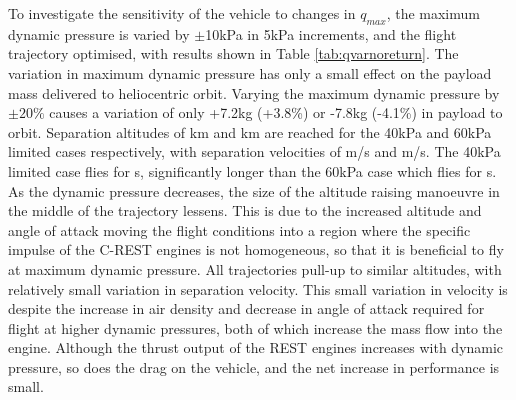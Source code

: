 To investigate the sensitivity of the vehicle to changes in $q_{max}$, the maximum dynamic pressure is varied by $\pm$10kPa in 5kPa increments, and the flight trajectory optimised, with results shown in Table \ref{tab:qvarnoreturn}.
The variation in maximum dynamic pressure has only a small effect on the payload mass delivered to heliocentric orbit.  Varying the maximum dynamic pressure by $\pm20\%$ causes a variation of only  +7.2kg (+3.8\%) or -7.8kg (-4.1\%) in payload to orbit.  
Separation altitudes of \secondthirdSeparationAltqFortyNoReturn km and \secondthirdSeparationAltqSixtyNoReturn km are reached for the 40kPa and 60kPa limited cases respectively, with separation velocities of \secondthirdSeparationvqFortyNoReturn m/s and \secondthirdSeparationvqSixtyNoReturn m/s. The 40kPa limited case flies for \secondFlightTimeqFortyNoReturn s, significantly longer than the 60kPa case which flies for \secondFlightTimeqSixtyNoReturn s.
As the dynamic pressure decreases, the size of the altitude raising manoeuvre in the middle of the trajectory lessens. This is due to the increased altitude and angle of attack moving the flight conditions into a region where the specific impulse of the C-REST engines is not homogeneous, so that it is beneficial to fly at maximum dynamic pressure.  
All trajectories pull-up to similar altitudes, with relatively small variation in separation velocity.
This small variation in velocity is despite the increase in air density and decrease in angle of attack required for flight at higher dynamic pressures, both of which increase the mass flow into the engine. Although the thrust output of the REST engines increases with dynamic pressure, so does the drag on the vehicle, and the net increase in performance is small. 


